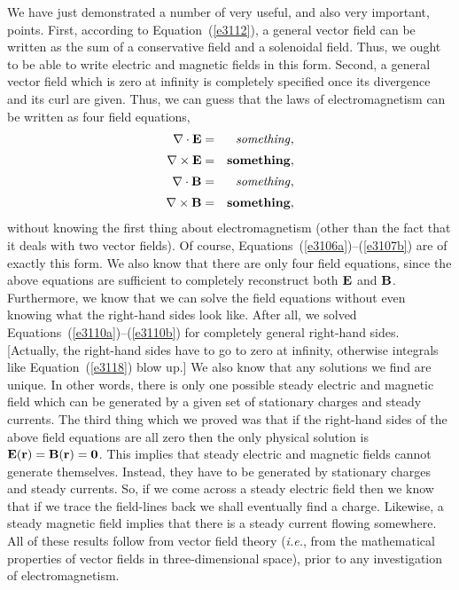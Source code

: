 We have just demonstrated a number of very useful, and also very important, points. 
First, according to Equation~(\ref{e3112}), a general vector field can be written as the
sum of a conservative field and a solenoidal field. Thus, we ought to be able
to write electric and magnetic fields in this form. Second, a general vector
field which is zero at infinity is completely specified once its divergence
and its curl are given. Thus, we can guess that the laws of electromagnetism
can be written as four field equations,
\begin{eqnarray}
\nabla\cdot{\bf E} &=& {\it something},\\[0.5ex]
\nabla\times{\bf E} &=& {\bf something},\\[0.5ex]
\nabla\cdot{\bf B} &=& {\it something},\\[0.5ex]
\nabla\times{\bf B} &=& {\bf something},
\end{eqnarray}
without knowing the first thing about electromagnetism (other than the fact that
it deals with two vector fields). Of course, 
Equations~(\ref{e3106a})--(\ref{e3107b}) are of
exactly this form. We also know that there are only four  field equations, since
the above equations are sufficient to completely reconstruct both ${\bf E}$ and
${\bf B}$. Furthermore, we know that we can solve the field equations without
even knowing what the right-hand sides look like. After all, we solved Equations~(\ref{e3110a})--(\ref{e3110b})
for completely general right-hand sides. [Actually, the right-hand sides have
to go to zero at infinity, otherwise integrals like Equation~(\ref{e3118}) blow up.]
We also know that any solutions we find are unique. In other words, there is only
one possible steady
electric and magnetic field which can be generated by a given set of
stationary charges and steady currents. The third thing which we proved was that
if the right-hand sides of the above field equations are all zero then
the only physical solution is ${\bf E}({\bf r}) = {\bf B}({\bf r}) = {\bf 0}$. This implies
that steady electric and magnetic fields cannot generate themselves.
Instead, they have to be generated by stationary charges and
steady currents. So, if we come across a steady electric field then we know that if
we trace the field-lines back we shall eventually find  a charge. 
Likewise, a steady magnetic field implies that there is a steady
current flowing somewhere. All of these results follow from vector field theory
({\em i.e.}, from the mathematical properties of vector fields in three-dimensional space), prior to
any investigation of electromagnetism.  

